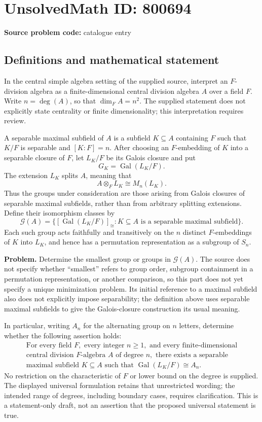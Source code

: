\documentclass[11pt]{article}
\begin{document}
\section*{UnsolvedMath ID: 800694}
\textbf{Source problem code:} catalogue entry
\subsection{Definitions and mathematical statement}
In the central simple algebra setting of the supplied source, interpret an \(F\)-division algebra as a finite-dimensional central division algebra \(A\) over a field \(F\). Write \(n=\deg(A)\), so that \(\dim_F A=n^2\). The supplied statement does not explicitly state centrality or finite dimensionality; this interpretation requires review.

A separable maximal subfield of \(A\) is a subfield \(K\subseteq A\) containing \(F\) such that \(K/F\) is separable and \([K:F]=n\). After choosing an \(F\)-embedding of \(K\) into a separable closure of \(F\), let \(L_K/F\) be its Galois closure and put
\[
G_K=\operatorname{Gal}(L_K/F).
\]
The extension \(L_K\) splits \(A\), meaning that
\[
A\otimes_F L_K\cong M_n(L_K).
\]
Thus the groups under consideration are those arising from Galois closures of separable maximal subfields, rather than from arbitrary splitting extensions. Define their isomorphism classes by
\[
\mathcal G(A)=\bigl\{[\operatorname{Gal}(L_K/F)]_{\cong}: K\subseteq A\text{ is a separable maximal subfield}\bigr\}.
\]
Each such group acts faithfully and transitively on the \(n\) distinct \(F\)-embeddings of \(K\) into \(L_K\), and hence has a permutation representation as a subgroup of \(S_n\).

\textbf{Problem.} Determine the smallest group or groups in \(\mathcal G(A)\). The source does not specify whether ``smallest'' refers to group order, subgroup containment in a permutation representation, or another comparison, so this part does not yet specify a unique minimization problem. Its initial reference to a maximal subfield also does not explicitly impose separability; the definition above uses separable maximal subfields to give the Galois-closure construction its usual meaning.

In particular, writing \(A_n\) for the alternating group on \(n\) letters, determine whether the following assertion holds:
\[
\begin{gathered}
\text{For every field }F,\text{ every integer }n\geq 1,\text{ and every finite-dimensional}\\
\text{central division }F\text{-algebra }A\text{ of degree }n,\text{ there exists a separable}\\
\text{maximal subfield }K\subseteq A\text{ such that }
\operatorname{Gal}(L_K/F)\cong A_n.
\end{gathered}
\]
No restriction on the characteristic of \(F\) or lower bound on the degree is supplied. The displayed universal formulation retains that unrestricted wording; the intended range of degrees, including boundary cases, requires clarification. This is a statement-only draft, not an assertion that the proposed universal statement is true.
\end{document}
